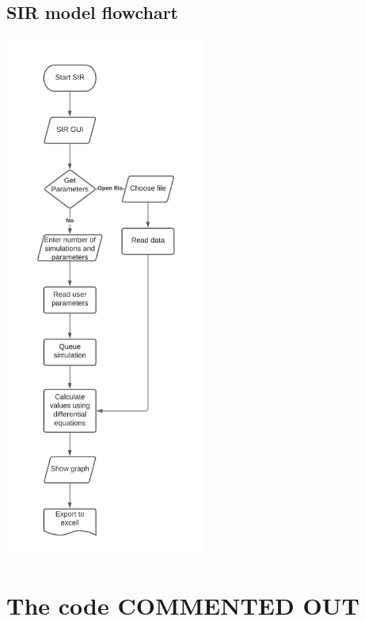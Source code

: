 \documentclass[11pt, a4paper]{article}
\begin{document}
\subsection{SIR model flowchart}
\includegraphics[height=17.3cm]{f_SIR.png}
\newpage


\newpage
\section{The code COMMENTED OUT}
\end{document}
